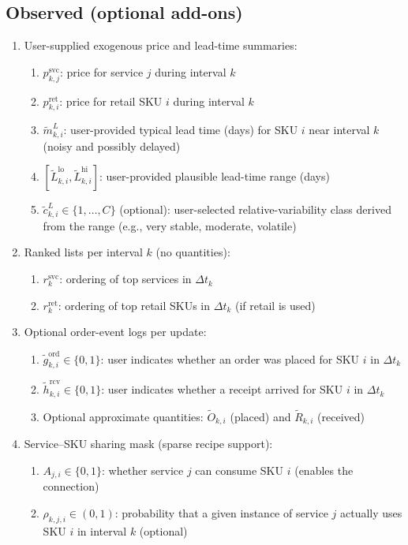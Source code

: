 \documentclass[11pt]{article}
\begin{document}
\subsection*{Observed (optional add-ons)}
\begin{enumerate}
  \item User-supplied exogenous price and lead-time summaries:
  \begin{enumerate}
    \item $p^{\mathrm{svc}}_{k,j}$: price for service $j$ during interval $k$
    \item $p^{\mathrm{ret}}_{k,i}$: price for retail SKU $i$ during interval $k$
    \item $\tilde m^L_{k,i}$: user-provided typical lead time (days) for SKU $i$ near interval $k$ (noisy and possibly delayed)
    \item $[\tilde L^{\mathrm{lo}}_{k,i},\tilde L^{\mathrm{hi}}_{k,i}]$: user-provided plausible lead-time range (days)
    \item $\tilde c^L_{k,i}\in\{1,\dots,C\}$ (optional): user-selected relative-variability class derived from the range (e.g., very stable, moderate, volatile)
  \end{enumerate}

  \item Ranked lists per interval $k$ (no quantities):
  \begin{enumerate}
    \item $r^{\mathrm{svc}}_k$: ordering of top services in $\Delta t_k$
    \item $r^{\mathrm{ret}}_k$: ordering of top retail SKUs in $\Delta t_k$ (if retail is used)
  \end{enumerate}

  \item Optional order-event logs per update:
  \begin{enumerate}
    \item $\tilde g^{\mathrm{ord}}_{k,i} \in \{0,1\}$: user indicates whether an order was placed for SKU $i$ in $\Delta t_k$
    \item $\tilde h^{\mathrm{rcv}}_{k,i} \in \{0,1\}$: user indicates whether a receipt arrived for SKU $i$ in $\Delta t_k$
    \item Optional approximate quantities: $\tilde O_{k,i}$ (placed) and $\tilde R_{k,i}$ (received)
  \end{enumerate}

  \item Service--SKU sharing mask (sparse recipe support):
  \begin{enumerate}
    \item $A_{j,i} \in \{0,1\}$: whether service $j$ can consume SKU $i$ (enables the connection)
    \item $\rho_{k,j,i} \in (0,1)$: probability that a given instance of service $j$ actually uses SKU $i$ in interval $k$ (optional)
  \end{enumerate}


\end{enumerate}
\end{document}
